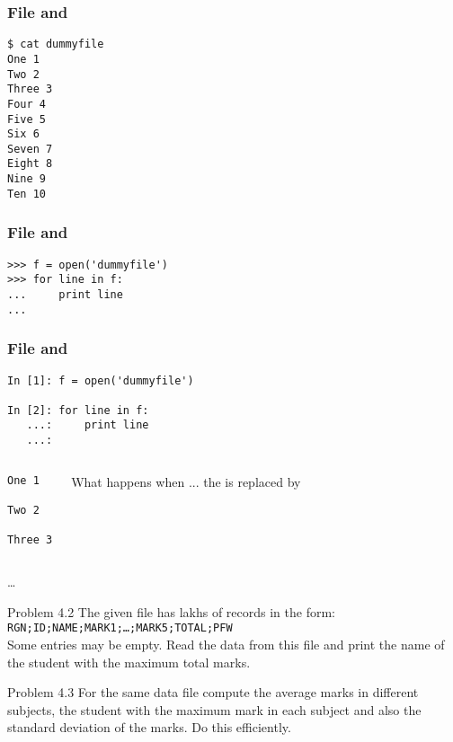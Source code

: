 \documentclass[14pt,compress]{beamer}
\newcounter{time}
\newcommand{\inctime}[1]{\addtocounter{time}{#1}{\tiny \thetime\ m}}
\newcommand{\typ}[1]{\texttt{#1}}
\newcommand{\kwrd}[1]{ \texttt{\textbf{\color{blue}{#1}}}  }
\begin{document}
\begin{frame}[fragile]
    \frametitle{File and \kwrd{for}}
\begin{lstlisting}
$ cat dummyfile
One 1
Two 2
Three 3
Four 4
Five 5
Six 6
Seven 7
Eight 8
Nine 9
Ten 10
\end{lstlisting}
\end{frame}

\begin{frame}[fragile]
    \frametitle{File and \kwrd{for}}
\begin{lstlisting}
>>> f = open('dummyfile')
>>> for line in f:
...     print line
...
\end{lstlisting}
\end{frame}

\begin{frame}[fragile]
    \frametitle{File and \kwrd{for}}
\begin{lstlisting}
In [1]: f = open('dummyfile')

In [2]: for line in f:
   ...:     print line
   ...:  
\end{lstlisting}

\begin{columns}

\begin{lstlisting}
One 1

Two 2

Three 3
\end{lstlisting}
\pause
\begin{block}{What happens when ...}
the \kwrd{print line} is replaced by \kwrd{print line,}
\end{block}
\end{columns}
\ldots
\end{frame}

\begin{frame}{Problem 4.2}
    The given file has lakhs of records in the form:\\
    \typ{RGN;ID;NAME;MARK1;\ldots;MARK5;TOTAL;PFW}\\
    Some entries may be empty.  Read the data from this file and print the
    name of the student with the maximum total marks.
\end{frame}

\begin{frame}{Problem 4.3}
    For the same data file compute the average marks in different
    subjects, the student with the maximum mark in each subject and also
    the standard deviation of the marks.  Do this efficiently.

    \inctime{30}
\end{frame}
\end{document}
